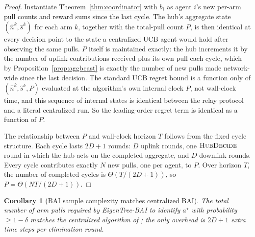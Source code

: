 \documentclass[letterpaper]{article} %
\newtheorem{corollary}{Corollary}
\begin{document}
\begin{proof}
Instantiate Theorem~\ref{thm:coordinator} with $b_i$ as agent $i$'s new
per-arm pull counts and reward sums since the last cycle. The hub's
aggregate state $(\hat n^k, \hat s^k)$ for each arm $k$, together with the
total-pull count $P$, is then identical at every decision point to the
state a centralized UCB agent would hold after observing the same pulls.
$P$ itself is maintained exactly: the hub increments it by the number of
uplink contributions received plus its own pull each cycle, which by
Proposition~\ref{prop:aggbcast} is exactly the number of new pulls made
network-wide since the last decision. The standard UCB regret bound is a
function only of $(\hat n^k,\hat s^k,P)$ evaluated at the algorithm's own
internal clock $P$, not wall-clock time, and this sequence of internal
states is identical between the relay protocol and a literal centralized
run. So the leading-order regret term is identical as a function of $P$.

The relationship between $P$ and wall-clock horizon $T$ follows from the
fixed cycle structure. Each cycle lasts $2D+1$ rounds: $D$ uplink rounds,
one $\textsc{HubDecide}$ round in which the hub acts on the completed
aggregate, and $D$ downlink rounds. Every cycle contributes exactly $N$ new
pulls, one per agent, to $P$. Over horizon $T$, the number of completed
cycles is $\Theta(T/(2D+1))$, so $P = \Theta(NT/(2D+1))$.
\end{proof}

\begin{corollary}[BAI sample complexity matches centralized BAI]
\label{cor:bai}
The total number of arm pulls required by EigenTree-BAI to identify $a^\star$ with probability $\geq 1-\delta$ matches the centralized algorithm of \citet{hillel2013distributed}; the only overhead is $2D+1$ extra time steps per elimination round.
\end{corollary}
\end{document}
